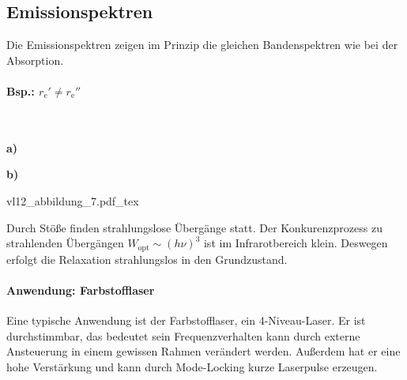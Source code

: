 \subsection{Emissionspektren}
    Die Emissionspektren zeigen im Prinzip die gleichen Bandenspektren wie bei der Absorption.\\
    \paragraph{Bsp.: $r_{\mathrm{e}}' \neq r_{\mathrm{e}}''$}~

    \hspace{3cm}
    \begin{minipage}{1cm}
       \textbf{\large{a)}}    
    \end{minipage}
    \begin{minipage}{14cm}
        \hspace{-3cm}
    \end{minipage}

    \hspace{4.5cm}
    \begin{minipage}{1cm}
       \textbf{\large{b)}}    
    \end{minipage}
    \begin{minipage}{14cm}
        \hspace{-0.5cm}
        \def\svgwidth{.35\columnwidth}
        {vl12_abbildung_7.pdf_tex}
    \end{minipage}
    \begin{center}
    \end{center}
    Durch Stöße finden strahlungslose Übergänge statt.
    Der Konkurenzprozess zu strahlenden Übergängen $W_{\mathrm{opt}} \sim (h \nu)^3$ ist im Infrarotbereich klein. 
    Deswegen erfolgt die Relaxation strahlungslos in den Grundzustand.

    \paragraph{Anwendung: Farbstofflaser} Eine typische Anwendung ist der Farbstofflaser, ein 4-Niveau-Laser. 
    Er ist durchstimmbar, das bedeutet sein Frequenzverhalten kann durch externe Ansteuerung in einem gewissen Rahmen verändert werden.
    Außerdem hat er eine hohe Verstärkung und kann durch Mode-Locking kurze Laserpulse erzeugen.

